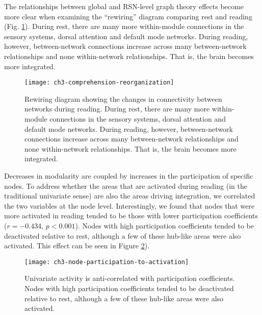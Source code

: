The relationships between global and RSN-level graph theory effects become more clear when examining the ``rewiring'' diagram comparing rest and reading (Fig. \ref{fig:ch3-comprehension-reorganization}). During rest, there are many more within-module connections in the sensory systems, dorsal attention and default mode networks. During reading, however, between-network connections increase across many between-network relationships and none within-network relationships. That is, the brain becomes more integrated. 

\begin{figure}[t]
	\centering
	\texttt{[image: ch3-comprehension-reorganization]}
    \caption[Rewiring of RSNs during reading.]{Rewiring diagram showing the changes in connectivity between networks during reading. During rest, there are many more within-module connections in the sensory systems, dorsal attention and default mode networks. During reading, however, between-network connections increase across many between-network relationships and none within-network relationships. That is, the brain becomes more integrated.}
	\label{fig:ch3-comprehension-reorganization}
\end{figure}

Decreases in modularity are coupled by increases in the participation of specific nodes. To address whether the areas that are activated during reading (in the traditional univariate sense) are also the areas driving integration, we correlated the two variables at the node level. Interestingly, we found that nodes that were more activated in reading tended to be those with lower participation coefficients ($r = -0.434$, $p < 0.001$). Nodes with high participation coefficients tended to be deactivated relative to rest, although a few of these hub-like areas were also activated. This effect can be seen in Figure \ref{fig:ch3-node-participation-to-activation}). 

\begin{figure}[t]
	\centering
	\texttt{[image: ch3-node-participation-to-activation]}
    \caption[Univariate activity is anti-correlated with participation coefficients.]{Univariate activity is anti-correlated with participation coefficients. Nodes with high participation coefficients tended to be deactivated relative to rest, although a few of these hub-like areas were also activated.}
	\label{fig:ch3-node-participation-to-activation}
\end{figure}



